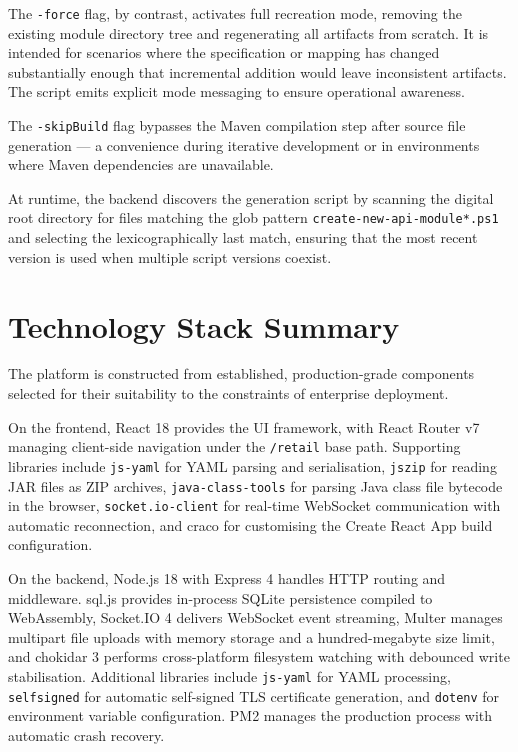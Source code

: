 The \texttt{-force} flag, by contrast, activates full recreation mode, removing the existing module directory tree and regenerating all artifacts from scratch. It is intended for scenarios where the specification or mapping has changed substantially enough that incremental addition would leave inconsistent artifacts. The script emits explicit mode messaging to ensure operational awareness.

The \texttt{-skipBuild} flag bypasses the Maven compilation step after source file generation --- a convenience during iterative development or in environments where Maven dependencies are unavailable.

At runtime, the backend discovers the generation script by scanning the digital root directory for files matching the glob pattern \texttt{create-new-api-\allowbreak module*.ps1} and selecting the lexicographically last match, ensuring that the most recent version is used when multiple script versions coexist.

\section{Technology Stack Summary}

The platform is constructed from established, production-grade components selected for their suitability to the constraints of enterprise deployment.

On the frontend, React 18 provides the UI framework, with React Router v7 managing client-side navigation under the \texttt{/retail} base path. Supporting libraries include \texttt{js-yaml} for YAML parsing and serialisation, \texttt{jszip} for reading JAR files as ZIP archives, \texttt{java-class-tools} for parsing Java class file bytecode in the browser, \texttt{socket.io-client} for real-time WebSocket communication with automatic reconnection, and craco for customising the Create React App build configuration.

On the backend, Node.js 18 with Express 4 handles HTTP routing and middleware. sql.js provides in-process SQLite persistence compiled to WebAssembly, Socket.IO 4 delivers WebSocket event streaming, Multer manages multipart file uploads with memory storage and a hundred-megabyte size limit, and chokidar 3 performs cross-platform filesystem watching with debounced write stabilisation. Additional libraries include \texttt{js-yaml} for YAML processing, \texttt{selfsigned} for automatic self-signed TLS certificate generation, and \texttt{dotenv} for environment variable configuration. PM2 manages the production process with automatic crash recovery.

